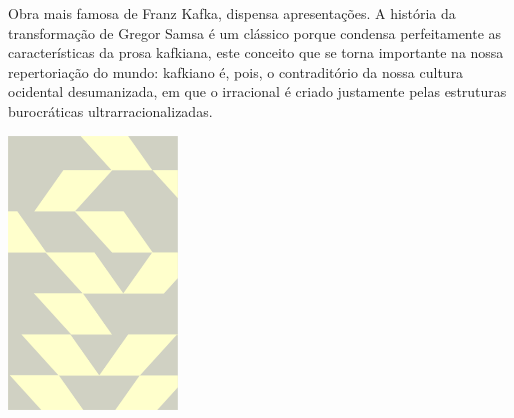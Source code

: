 \hspace*{-7cm}\hrulefill\hspace*{-7cm}

\medskip

\noindent{}Obra mais famosa de Franz Kafka, {} dispensa apresentações. A história da transformação de Gregor Samsa é um clássico porque condensa perfeitamente as características da prosa kafkiana, este conceito que se torna importante na nossa repertoriação do mundo: kafkiano é, pois, o contraditório da nossa cultura ocidental desumanizada, em que o irracional é criado justamente pelas estruturas burocráticas ultrarracionalizadas.

\vfill

\hspace*{-.4cm}\begin{minipage}[c]{1\linewidth}
\small{
{}}
\end{minipage}


\pagebreak

\hspace{.5cm}

\begin{center}
\hspace*{-.5cm}\includegraphics[width=45mm]{./imgs/maquiavel.png}
\end{center}

